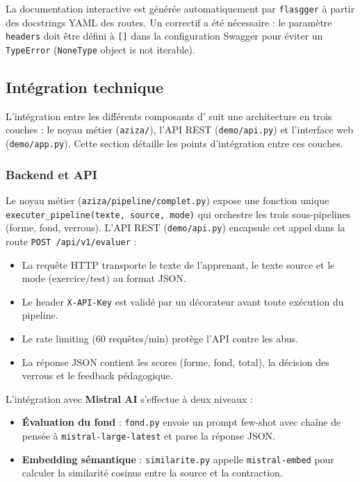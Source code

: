 La documentation interactive est générée automatiquement par \texttt{flasgger} à partir des docstrings YAML des routes. Un correctif a été nécessaire : le paramètre \texttt{headers} doit être défini à \texttt{[]} dans la configuration Swagger pour éviter un \texttt{TypeError} (\texttt{NoneType} object is not iterable).

\subsection{Intégration technique}

L'intégration entre les différents composants d'\AZIZA{} suit une architecture en trois couches : le noyau métier (\texttt{aziza/}), l'API REST (\texttt{demo/api.py}) et l'interface web (\texttt{demo/app.py}). Cette section détaille les points d'intégration entre ces couches.

\subsubsection{Backend et API}

Le noyau métier (\texttt{aziza/pipeline/complet.py}) expose une fonction unique \texttt{executer\_pipeline(texte, source, mode)} qui orchestre les trois sous-pipelines (forme, fond, verrous). L'API REST (\texttt{demo/api.py}) encapsule cet appel dans la route \texttt{POST /api/v1/evaluer} :

\begin{itemize}
    \item La requête HTTP transporte le texte de l'apprenant, le texte source et le mode (exercice/test) au format JSON.
    \item Le header \texttt{X-API-Key} est validé par un décorateur avant toute exécution du pipeline.
    \item Le rate limiting (60 requêtes/min) protège l'API contre les abus.
    \item La réponse JSON contient les scores (forme, fond, total), la décision des verrous et le feedback pédagogique.
\end{itemize}

L'intégration avec \textbf{Mistral AI} s'effectue à deux niveaux :

\begin{itemize}
    \item \textbf{Évaluation du fond} : \texttt{fond.py} envoie un prompt few-shot avec chaîne de pensée à \texttt{mistral-large-latest} et parse la réponse JSON.
    \item \textbf{Embedding sémantique} : \texttt{similarite.py} appelle \texttt{mistral-embed} pour calculer la similarité cosinus entre la source et la contraction.
\end{itemize}

